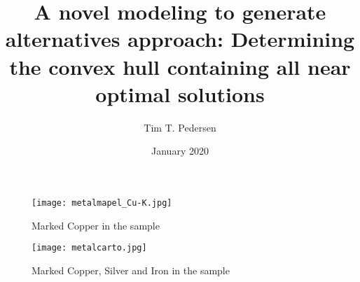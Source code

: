 


\title{\Huge A novel modeling to generate alternatives approach: Determining the convex hull containing all near optimal solutions}
\author{ Tim T. Pedersen}
\date{ January 2020}


\frontmatter
\maketitle
\clearpage

\clearpage


\mainmatter
{}
{}\thispagestyle{empty}
\setcounter{chapter}{0}
\renewcommand{\thechapter}{\arabic{chapter}}

\listoffixmes

\clearpage














\begingroup
	
%				
\endgroup





\appendix
\clearpage
{}
\setcounter{chapter}{0}
\renewcommand{\thechapter}{\Alph{chapter}}

















\begin{figure}[H]
  \centering
  \begin{minipage}[b]{0.48\textwidth}
    \texttt{[image: metalmapel\_Cu-K.jpg]}
    \caption{Marked Copper in the sample}
  \end{minipage}
  \hfill
  \begin{minipage}[b]{0.48\textwidth}
    \texttt{[image: metalcarto.jpg]}
    \caption{Marked Copper, Silver and Iron in the sample}
  \end{minipage}
\end{figure}